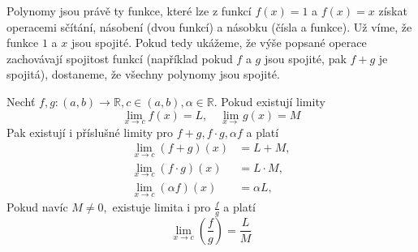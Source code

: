   Polynomy jsou právě ty funkce, které lze z funkcí $f(x)=1$ a $f(x)=x$ získat operacemi sčítání, násobení (dvou funkcí) a násobku (čísla a funkce). Už víme, že funkce $1$ a $x$ jsou spojité. Pokud tedy ukážeme, že výše popsané operace zachovávají spojitost funkcí (například pokud $f$ a $g$ jsou spojité, pak $f+g$ je spojitá), dostaneme, že všechny polynomy jsou spojité.

\begin{věta} Nechť $f,g\colon (a,b)\to \mathbb{R}, c\in(a,b), \alpha\in \mathbb{R}.$ Pokud existují limity
\begin{equation*}
	\lim_{x\to c}f(x) = L, \hspace{1em} \lim_{x\to}g(x) = M
\end{equation*}
Pak existují i příslušné limity pro $f+g,f\cdot g, \alpha f$ a platí
\begin{align}
	\lim_{x\to c}(f+g)(x)&=L+M,\label{eq:limita souctu} \\
	\lim_{x\to c}(f\cdot g)(x)&=L\cdot M, \label{eq:limita soucinu} \\
	\lim_{x\to c}(\alpha f)(x)&=\alpha L, \label{eq:limita nasobku}
\end{align}
Pokud navíc $M\neq 0,$ existuje limita i pro $\frac{f}{g}$ a platí
\begin{equation}
	\lim_{x\to c}\left(\frac{f}{g}\right) = \frac{L}{M} \label{eq:limita podilu}
\end{equation}
\end{věta}
